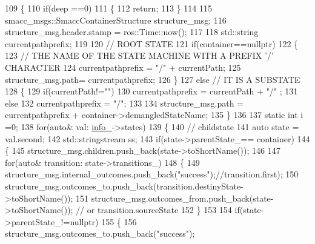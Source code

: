 \begin{DoxyCode}
109     \{
110         \textcolor{keywordflow}{if}(deep ==0)
111         \{
112             \textcolor{keywordflow}{return};
113         \}
114 
115         smacc\_msgs::SmaccContainerStructure structure\_msg;
116         structure\_msg.header.stamp = ros::Time::now();
117 
118         std::string currentpathprefix;
119         
120         \textcolor{comment}{// ROOT STATE}
121         \textcolor{keywordflow}{if}(container==\textcolor{keyword}{nullptr})
122         \{
123             \textcolor{comment}{// THE NAME OF THE STATE MACHINE WITH A PREFIX '/' CHARACTER}
124             currentpathprefix = \textcolor{stringliteral}{"/"} + currentPath;
125             structure\_msg.path= currentpathprefix;
126         \}
127         \textcolor{keywordflow}{else} \textcolor{comment}{// IT IS A SUBSTATE}
128         \{
129             \textcolor{keywordflow}{if}(currentPath!=\textcolor{stringliteral}{""})
130                 currentpathprefix = currentPath + \textcolor{stringliteral}{"/"}  ;
131             \textcolor{keywordflow}{else}
132                 currentpathprefix = \textcolor{stringliteral}{"/"};
133 
134             structure\_msg.path = currentpathprefix + container->demangledStateName;
135         \}
136 
137         \textcolor{keyword}{static} \textcolor{keywordtype}{int} i =0;
138         \textcolor{keywordflow}{for}(\textcolor{keyword}{auto}& val: \hyperlink{classsmacc_1_1ISmaccStateMachine_a5ec3201cbddab4f062f572fb33021041}{info\_}->states)
139         \{
140             \textcolor{comment}{// childstate}
141             \textcolor{keyword}{auto} state = val.second;
142             std::stringstream ss;
143             \textcolor{keywordflow}{if}(state->parentState\_== container)
144             \{
145                 structure\_msg.children.push\_back(state->toShortName());    
146 
147                 \textcolor{keywordflow}{for}(\textcolor{keyword}{auto}& transition: state->transitions\_)
148                 \{
149                     structure\_msg.internal\_outcomes.push\_back(\textcolor{stringliteral}{"success"});\textcolor{comment}{//transition.first);  }
150                     structure\_msg.outcomes\_to.push\_back(transition.destinyState->toShortName());
151                     structure\_msg.outcomes\_from.push\_back(state->toShortName()); \textcolor{comment}{// or
       transition.sourceState}
152                 \}
153 
154                 \textcolor{keywordflow}{if}(state->parentState\_!=\textcolor{keyword}{nullptr})
155                 \{
156                     structure\_msg.outcomes\_to.push\_back(\textcolor{stringliteral}{"success"});

\end{DoxyCode}
